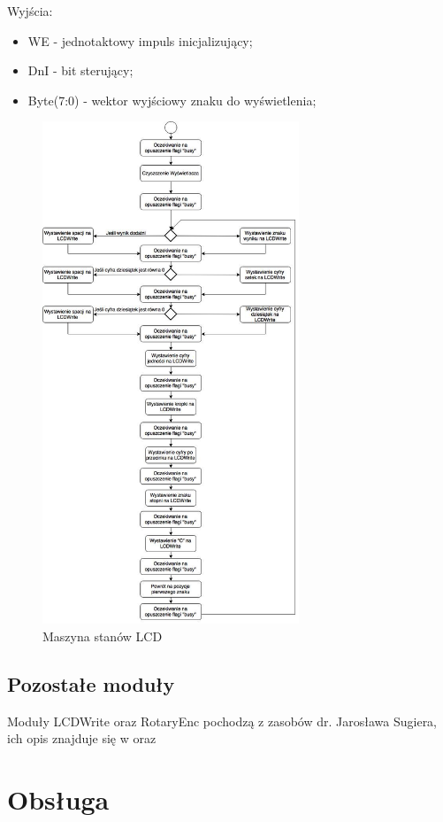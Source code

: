 \documentclass[a4paper]{article}
\begin{document}
Wyjścia:
\begin{itemize}
\item WE - jednotaktowy impuls inicjalizujący; 
\item DnI - bit sterujący;
\item Byte(7:0) - wektor wyjściowy znaku do wyświetlenia;
\end{itemize}

\begin{figure}[H]
\begin{center}
\includegraphics[height=15cm]{graphics/lcd_fsm.png}
\end{center}
\caption{Maszyna stanów LCD}
\label{lcd_fsm}
\end{figure}

\subsection{Pozostałe moduły}

Moduły LCDWrite oraz RotaryEnc pochodzą z zasobów dr. Jarosława Sugiera, ich opis znajduje się w \cite{bib_lcdwrite} oraz \cite{bib_rotaryenc}

\section{Obsługa}
\end{document}
